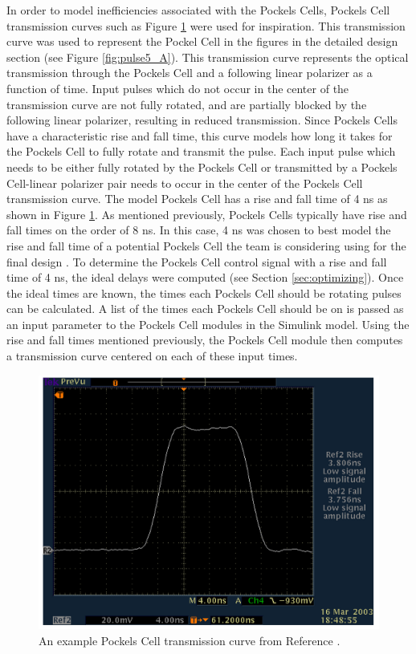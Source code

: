 \documentclass[pdftex,12pt,a4paper]{article}
\begin{document}
In order to model inefficiencies associated with the Pockels Cells, Pockels Cell transmission curves such as Figure \ref{fig:bergmann} were used for inspiration. This transmission curve was used to represent the Pockel Cell in the figures in the detailed design section (see Figure \ref{fig:pulse5_A}). This transmission curve represents the optical transmission through the Pockels Cell and a following linear polarizer as a function of time. Input pulses which do not occur in the center of the transmission curve are not fully rotated, and are partially blocked by the following linear polarizer, resulting in reduced transmission. Since Pockels Cells have a characteristic rise and fall time, this curve models how long it takes for the Pockels Cell to fully rotate and transmit the pulse. Each input pulse which needs to be either fully rotated by the Pockels Cell or transmitted by a Pockels Cell-linear polarizer pair needs to occur in the center of the Pockels Cell transmission curve. The model Pockels Cell has a rise and fall time of 4 ns as shown in Figure \ref{fig:bergmann}. As mentioned previously, Pockels Cells typically have rise and fall times on the order of 8 ns. In this case, 4 ns was chosen to best model the rise and fall time of a potential Pockels Cell the team is considering using for the final design \cite{lightgate_pockel}. To determine the Pockels Cell control signal with a rise and fall time of 4 ns, the ideal delays were computed (see Section \ref{sec:optimizing}). Once the ideal times are known, the times each Pockels Cell should be rotating pulses can be calculated. A list of the times each Pockels Cell should be on is passed as an input parameter to the Pockels Cell modules in the Simulink model. Using the rise and fall times mentioned previously, the Pockels Cell module then computes a transmission curve centered on each of these input times.

\begin{figure}[H]
  \centering
    \includegraphics[scale=0.8]{BergmannPC.PNG}
  \caption{An example Pockels Cell transmission curve from Reference \cite{bme_pockel}.}
  \label{fig:bergmann}
\end{figure}
\end{document}
